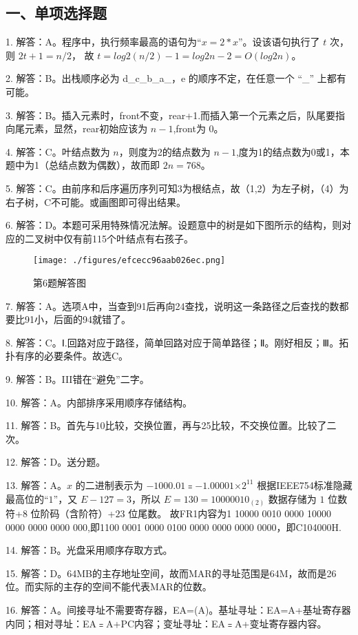 \subsection{一、单项选择题}
1. 解答：A。程序中，执行频率最高的语句为“$x=2*x$”。设该语句执行了 $t$ 次，则 $2t+1=n/2$， 故 $t=log2(n/2)-1=log2n-2= O(log2n)$。

2. 解答：B。出栈顺序必为 d\_c\_b\_a\_，e 的顺序不定，在任意一个 “\_” 上都有可能。

3. 解答：B。插入元素时，front不变，rear+1.而插入第一个元素之后，队尾要指向尾元素，显然，rear初始应该为 $n-1$,front为 $0$。

4. 解答：C。叶结点数为 $n$，则度为2的结点数为 $n-1$,度为1的结点数为0或1，本题中为1（总结点数为偶数），故而即 $2n=768$。

5. 解答：C。由前序和后序遍历序列可知3为根结点，故（1,2）为左子树，（4）为右子树，C不可能。或画图即可得出结果。

6. 解答：D。本题可采用特殊情况法解。设题意中的树是如下图所示的结构，则对应的二叉树中仅有前115个叶结点有右孩子。\\
\begin{figure}[ht]
\centering
\texttt{[image: ./figures/efcecc96aab026ec.png]}
\caption{第6题解答图} \label{fig_Na11_4}
\end{figure}

7. 解答：A。选项A中，当查到91后再向24查找，说明这一条路径之后查找的数都要比91小，后面的94就错了。

8. 解答：C。Ⅰ.回路对应于路径，简单回路对应于简单路径；Ⅱ。刚好相反；Ⅲ。拓扑有序的必要条件。故选C。

9. 解答：B。III错在“避免”二字。

10. 解答：A。内部排序采用顺序存储结构。

11. 解答：B。首先与10比较，交换位置，再与25比较，不交换位置。比较了二次。

12. 解答：D。送分题。

13. 解答：A。$x$ 的二进制表示为 $-1000.01$﹦$-1.000 01$×$2^{11}$ 根据IEEE754标准隐藏最高位的“$1$”，又 $E-127=3$，所以 $E=130=1000 0010_{(2)}$ 数据存储为 $1$ 位数符+$8$ 位阶码（含阶符）+$23$ 位尾数。
故FR1内容为1 10000 0010 0000 10000 0000 0000 0000 000,即1100 0001 0000 0100 0000 0000 0000 0000，即C104000H.

14. 解答：B。光盘采用顺序存取方式。

15. 解答：D。64MB的主存地址空间，故而MAR的寻址范围是64M，故而是26位。而实际的主存的空间不能代表MAR的位数。

16. 解答：A。间接寻址不需要寄存器，EA=(A)。基址寻址：EA=A+基址寄存器内同；相对寻址：EA﹦A+PC内容；变址寻址：EA﹦A+变址寄存器内容。

